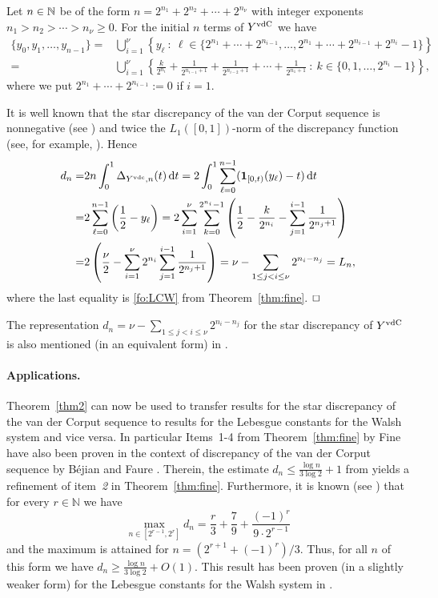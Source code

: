 \documentclass[12pt]{article}
\newenvironment{proof}{\begin{trivlist}
    \item[\hskip\labelsep{\it Proof.}]}{$\hfill\Box$\end{trivlist}}
\newcommand{\NN}{{\Bbb N}}
\newcommand{\rd}{\,{\rm d}}
\begin{document}
\begin{proof}
Let $n \in \NN$ be of the form $n=2^{n_1}+2^{n_2}+\cdots+2^{n_{\nu}}$ with integer exponents $n_1 > n_2 > \cdots > n_{\nu}\ge 0$. For the initial $n$ terms of $Y^{\rm vdC}$ we have 
\begin{align*}
\{y_0,y_1,\ldots,y_{n-1}\} = & \bigcup_{i=1}^{\nu}\left\{y_{\ell}\ : \ \ell \in \{2^{n_1}+\cdots+2^{n_{i-1}},\ldots, 2^{n_1}+\cdots+2^{n_{i-1}}+2^{n_i}-1\}\right\}\\
= & \bigcup_{i=1}^{\nu} \left\{\frac{k}{2^{n_i}}+\frac{1}{2^{n_{i-1}+1}}+\frac{1}{2^{n_{i-2}+1}}+\cdots +\frac{1}{2^{n_1+1}} \ : \ k \in \{0,1,\ldots,2^{n_i}-1\}\right\},
\end{align*}
where we put $2^{n_1}+\cdots+2^{n_{i-1}}:=0$ if $i=1$.

It is well known that the star discrepancy of the van der Corput sequence is nonnegative (see \cite[Remark~3]{p04}) and twice the $L_1([0,1])$-norm of the discrepancy function (see, for example, \cite{PA}). Hence 
\begin{align}\label{stl1}
d_n = & 2 n  \int_0^1 \Delta_{Y^{\rm vdc},n}(t) \rd t = 2 \int_0^1 \sum_{\ell=0}^{n-1} (\boldsymbol{1}_{[0,t)}(y_{\ell}) -t) \rd t\\
= & 2 \sum_{\ell=0}^{n-1} \left(\frac{1}{2}-y_{\ell}\right) = 2 \sum_{i=1}^{\nu} \sum_{k=0}^{2^{n_i}-1} \left(\frac{1}{2}-\frac{k}{2^{n_i}}- \sum_{j=1}^{i-1} \frac{1}{2^{n_j+1}}\right)\nonumber\\
= & 2 \left(\frac{\nu}{2}-\sum_{i=1}^{\nu}2^{n_i} \sum_{j=1}^{i-1} \frac{1}{2^{n_j+1}} \right) = \nu-\sum_{1\le j < i \le \nu}2^{n_i-n_j} =L_n,\nonumber
\end{align}
where the last equality is \eqref{fo:LCW} from Theorem~\ref{thm:fine}.
\end{proof}

The representation $d_n=\nu-\sum_{1\le j < i \le \nu}2^{n_i-n_j}$ for the star discrepancy of $Y^{\rm vdC}$ is also mentioned (in an equivalent form) in \cite[p.~61]{spi}.

\paragraph{Applications.} Theorem~\ref{thm2} can now be used to transfer results for the star discrepancy of the van der Corput sequence to results for the Lebesgue constants for the Walsh system and vice versa. In particular Items~1-4 from Theorem~\ref{thm:fine} by Fine have also been proven in the context of discrepancy of the van der Corput sequence by B\'{e}jian and Faure \cite{befa,befa77}. Therein, the estimate $d_n \le \frac{\log n}{3 \log 2} +1$ from \cite[Th\'eor\`eme~3]{befa77} yields a refinement of item~{\it 2} in Theorem~\ref{thm:fine}. Furthermore, it is known (see \cite[Lemme~4.1]{fau1990}) that for every $r \in \mathbb{N}$ we have $$\max_{n \in [2^{r-1},2^r]} d_n = \frac{r}{3}+\frac{7}{9}+\frac{(-1)^r}{9 \cdot 2^{r-1}}$$ and the maximum is attained for $n=(2^{r+1}+(-1)^r)/3$.  Thus, for all $n$ of this form we have $d_n \ge \frac{\log n}{3 \log 2} +O(1)$. This result has been proven (in a slightly weaker form) for the Lebesgue constants for the Walsh system in \cite[Theorem~2]{AS2}.
\end{document}

